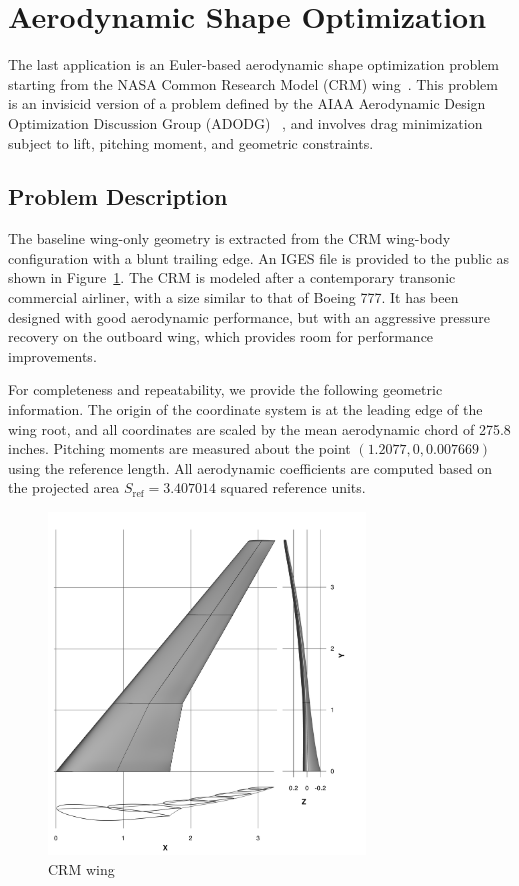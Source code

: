 \newpage
\section{Aerodynamic Shape Optimization}

The last application is an Euler-based aerodynamic shape optimization problem starting from the NASA Common Research Model (CRM) wing~\cite{crm_wing}. This problem is an invisicid version of a problem defined by
the AIAA Aerodynamic Design Optimization Discussion Group (ADODG) ~\cite{adodg}, and involves drag minimization subject to lift, pitching moment, and geometric constraints.   

\subsection{Problem Description}
The baseline wing-only geometry is extracted from the CRM wing-body configuration with a blunt trailing edge. An IGES file is provided to the public as shown in Figure~\ref{fig:crm_wing}. The CRM is modeled after a contemporary transonic commercial airliner, with a size similar to that of Boeing 777. It has been designed with good aerodynamic performance, but with an aggressive pressure recovery on the outboard wing, which provides room for performance improvements. 

For completeness and repeatability, we provide the following geometric information. 
The origin of the coordinate system is at the leading edge of the wing root, and all coordinates are scaled by the mean aerodynamic chord of 275.8 inches. Pitching moments are measured about the point $(1.2077, 0, 0.007669)$ using the reference length. All aerodynamic coefficients are computed based on the projected area $S_{\text{ref}}=3.407014$ squared reference units. 

\begin{figure}[tbp]
  \centering
  \includegraphics[clip,width=0.75\textwidth]{./figs/chap7_aso/CRM-wing.png}%
  \caption{CRM wing \label{fig:crm_wing}}
\end{figure}


